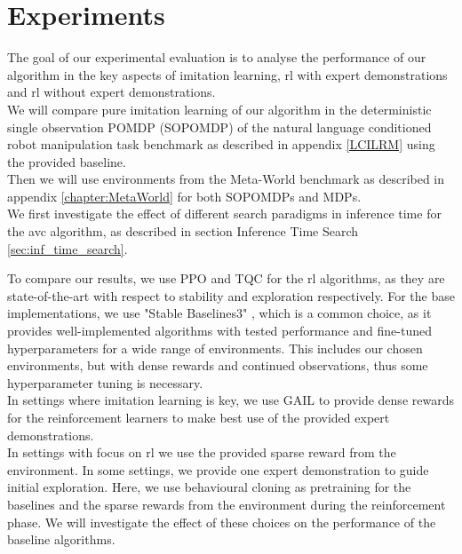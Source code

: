
\chapter{Experiments}
\label{chapter:Experiments}
The goal of our experimental evaluation is to analyse the performance of our algorithm in the key aspects of 
imitation learning, \ac{rl} with expert demonstrations and \ac{rl} without expert demonstrations. \\

We will compare pure imitation learning of our algorithm in the deterministic single observation POMDP (SOPOMDP) of the 
natural language conditioned robot manipulation task benchmark as described in appendix \ref{LCILRM} using the provided baseline.\\

Then we will use environments from the Meta-World benchmark as described in appendix \ref{chapter:MetaWorld} for both SOPOMDPs and MDPs.\\

We first investigate the effect of different search paradigms in inference time for the \ac{avc} algorithm, as described in section Inference Time Search \ref{sec:inf_time_search}.

To compare our results, we use PPO and TQC for the \ac{rl} algorithms, as they are state-of-the-art with respect to stability and 
exploration respectively. For the base implementations, we use "Stable Baselines3" \cite{stable-baselines3}, which is a common choice, as it provides well-implemented algorithms with tested
performance and fine-tuned hyperparameters for a wide range of environments. This includes our chosen environments, but with dense rewards and continued observations,
thus some hyperparameter tuning is necessary.\\

In settings where imitation learning is key, we use GAIL to provide dense rewards for the reinforcement learners to make best use of the provided expert demonstrations. \\

In settings with focus on \ac{rl} we use the provided sparse reward from the environment. In some settings, we provide one 
expert demonstration to guide initial exploration. Here, we use behavioural cloning as pretraining for the baselines and the sparse rewards from the environment during the reinforcement phase. 
We will investigate the effect of these choices on the performance of the baseline algorithms.\\

